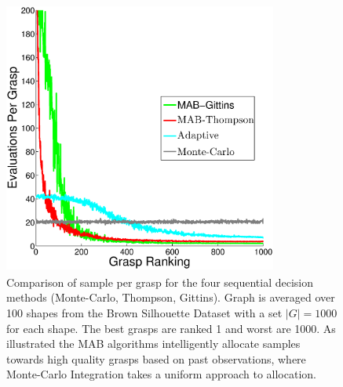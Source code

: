 \documentclass[journal,transmag]{IEEEtran}%
\begin{document}
\begin{figure}[ht!]
\centering
\includegraphics[width = 9cm, height = 9cm]{matlab_figures/pulls_per_grasp.eps}
\caption{ \footnotesize Comparison of sample per grasp for the four sequential decision methods (Monte-Carlo, Thompson, Gittins). Graph is averaged over 100 shapes from the Brown Silhouette Dataset \cite{brown} with a set $|G|=1000$ for each shape. The best grasps are ranked 1 and worst are 1000. As illustrated the MAB algorithms intelligently allocate samples towards high quality grasps based on past observations, where Monte-Carlo Integration takes a uniform approach to allocation. }

\vspace*{-10pt}
\label{fig:pulls_per_grasp}
\end{figure}
\end{document}
